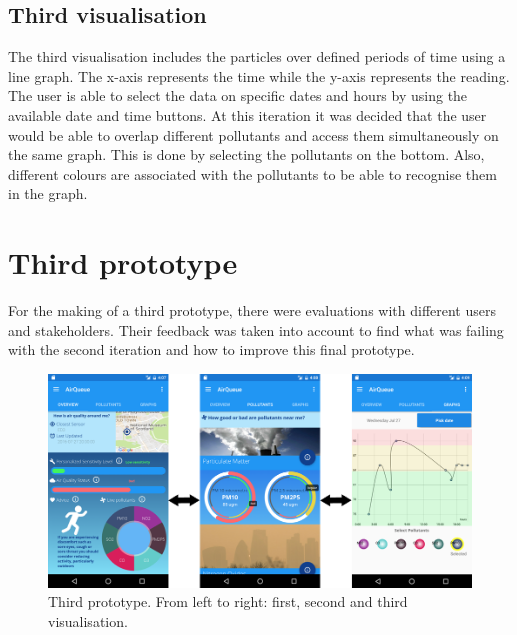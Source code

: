 \subsection{Third visualisation}
The third visualisation includes the particles over defined periods of time using a line graph. The x-axis represents the time while the y-axis represents the reading. The user is able to select the data on specific dates and hours by using the available date and time buttons. At this iteration it was decided that the user would be able to overlap different pollutants and access them simultaneously on the same graph. This is done by selecting the pollutants on the bottom. Also, different colours are associated with the pollutants to be able to recognise them in the graph.

\section{Third prototype}
For the making of a third prototype, there were evaluations with different users and stakeholders. Their feedback was taken into account to find what was failing with the second iteration and how to improve this final prototype. 

\begin{figure}[H]
\begin{adjustbox}{width=1.2\textwidth,center=\textwidth}
  \centering
  \includegraphics[scale=1]{images/thirdPrototype.png}
\end{adjustbox}
  \caption[Third prototype]{Third prototype. From left to right: first, second and third visualisation.}
  \label{fig:third_prototype}
\end{figure}


